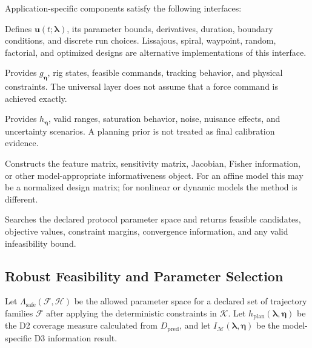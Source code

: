 \documentclass[11pt,a4paper]{article}
\begin{document}
Application-specific components satisfy the following interfaces:
\begin{description}[style=nextline]
    \item[Protocol-family interface.]
    Defines
    $\mathbf{u}(t;\boldsymbol{\lambda})$, its parameter bounds, derivatives,
    duration, boundary conditions, and discrete run choices. Lissajous,
    spiral, waypoint, random, factorial, and optimized designs are alternative
    implementations of this interface.

    \item[Rig interface.]
    Provides $g_{\boldsymbol{\eta}}$, rig states, feasible commands, tracking
    behavior, and physical constraints. The universal layer does not assume
    that a force command is achieved exactly.

    \item[Sensor interface.]
    Provides $h_{\boldsymbol{\eta}}$, valid ranges, saturation behavior, noise,
    nuisance effects, and uncertainty scenarios. A planning prior is not
    treated as final calibration evidence.

    \item[Calibration-model interface.]
    Constructs the feature matrix, sensitivity matrix, Jacobian, Fisher
    information, or other model-appropriate informativeness object. For an
    affine model this may be a normalized design matrix; for nonlinear or
    dynamic models the method is different.

    \item[Optimizer interface.]
    Searches the declared protocol parameter space and returns feasible
    candidates, objective values, constraint margins, convergence information,
    and any valid infeasibility bound.
\end{description}

\subsection{Robust Feasibility and Parameter Selection}

Let $\Lambda_{\mathrm{safe}}(\mathcal{F},\mathcal{H})$ be the allowed parameter
space for a declared set of trajectory families $\mathcal{F}$ after applying
the deterministic constraints in $\mathcal{K}$. Let
$h_{\mathrm{plan}}(\boldsymbol{\lambda},\boldsymbol{\eta})$ be the D2 coverage
measure calculated from $D_{\mathrm{pred}}$, and let
$I_{\mathcal{M}}(\boldsymbol{\lambda},\boldsymbol{\eta})$ be the
model-specific D3 information result.
\end{document}
